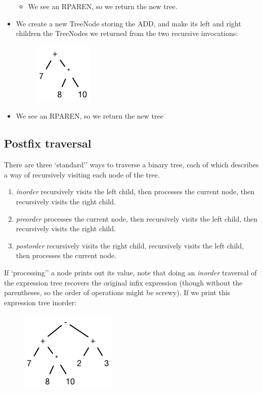 \documentclass{article}
\begin{document}
\begin{itemize}
\begin{itemize}
\item We see an \textsf{RPAREN}, so we return the new tree.
\end{itemize}

\item We create a new \textsf{TreeNode} storing the \textsf{ADD}, and make its left and right children the \textsf{TreeNode}s we returned from the two recursive invocations:
\begin{figure}[H]
\centering
\includegraphics[scale=0.5]{step5.png}
\end{figure}

\item We see an \textsf{RPAREN}, so we return the new tree
\end{itemize}

\subsection{Postfix traversal}

There are three `standard'' ways to traverse a binary tree, each of which describes a way of recursively visiting each node of the tree.

\begin{enumerate}
\item    {\em inorder} recursively visits the left child, then processes the current node, then recursively visits the right child.
\item    {\em preorder} processes the current node, then recursively visits the left child, then recursively visits the right child.
\item    {\em postorder} recursively visits the right child, recursively visits the left child, then processes the current node.
\end{enumerate}

If `processing'' a node prints out its value, note that doing an {\em inorder} traversal of the expression tree recovers the original infix expression (though without the parentheses, so the order of operations might be screwy). If we print this expression tree inorder:

\begin{figure}[H]
\centering
\includegraphics[scale=0.5]{exptree2.png}
\end{figure}
\end{document}
